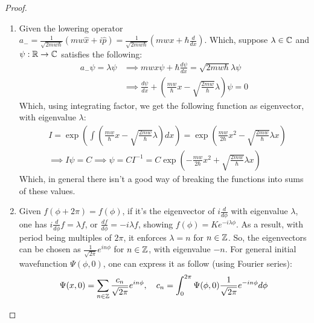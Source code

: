 \documentclass{article}
\begin{document}
\begin{proof}
\begin{enumerate}
        \item Given the lowering operator $a_- = \frac{1}{\sqrt{2mw\hbar}}(mw\hat{x}+i\hat{p}) = \frac{1}{\sqrt{2mw\hbar}}\left(mwx + \hbar\frac{d}{dx}\right)$. Which, suppose $\lambda\in\mathbb{C}$ and $\psi:\mathbb{R}\rightarrow\mathbb{C}$ satisfies the following:
        \begin{align}
            a_- \psi = \lambda \psi &\implies mwx\psi + \hbar\frac{d\psi}{dx} = \sqrt{2mw\hbar} \lambda \psi\\
            &\implies \frac{d\psi}{dx} +\left(\frac{mw}{\hbar}x-\sqrt{\frac{2mw}{\hbar}}\lambda\right)\psi=0
        \end{align}
        Which, using integrating factor, we get the following function as eigenvector, with eigenvalue $\lambda$:
        \begin{align}
            &I = \exp\left(\int \left(\frac{mw}{\hbar}x - \sqrt{\frac{2mw}{\hbar}}\lambda\right)dx\right) = \exp\left(\frac{mw}{2\hbar}x^2 - \sqrt{\frac{2mw}{\hbar}}\lambda x\right)\\
            &\implies I \psi = C\implies \psi = CI^{-1} = C\exp\left(-\frac{mw}{2\hbar}x^2 + \sqrt{\frac{2mw}{\hbar}}\lambda x\right)
        \end{align}
        Which, in general there isn't a good way of breaking the functions into sums of these values.
        
        \hfil

        \item Given $f(\phi+2\pi)=f(\phi)$, if it's the eigenvector of $i\frac{d}{d\phi}$ with eigenvalue $\lambda$, one has $i\frac{d}{d\phi}f = \lambda f$, or $\frac{df}{d\phi}=-i\lambda f$, showing $f(\phi) = Ke^{-i\lambda \phi}$. As a result, with period being multiples of $2\pi$, it enforces $\lambda = n$ for $n\in\mathbb{Z}$. So, the eigenvectors can be chosen as $\frac{1}{\sqrt{2\pi}}e^{in\phi}$ for $n\in\mathbb{Z}$, with eigenvalue $-n$. For general initial wavefunction $\Psi(\phi,0)$, one can express it as follow (using Fourier series):
        \begin{align}
            \Psi(x,0) = \sum_{n\in\mathbb{Z}}\frac{c_n}{\sqrt{2\pi}}e^{in\phi}, \quad c_n = \int_{0}^{2\pi}\Psi(\phi,0)\frac{1}{\sqrt{2\pi}}e^{-in\phi}d\phi
        \end{align}

        \hfil


\end{enumerate}
\end{proof}
\end{document}
